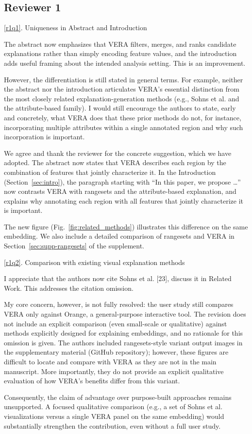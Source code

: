 \documentclass[11pt]{article}
\newcounter{rtaskno}
\newcommand{\rtask}[1]{\refstepcounter{rtaskno}\label{#1}}
\newcommand{\reviewc}[2]{\begin{leftbar}\noindent\rtask{#1}\ref{#1}. #2\end{leftbar}\vspace*{-4mm}}
\newcommand{\answer}[1]{\noindent #1\par\vspace{2mm}}
\newlength{\leftbarwidth}
\newlength{\leftbarsep}
\renewenvironment{leftbar}{%
    \def\FrameCommand{{\color{black}{\vrule width \leftbarwidth\relax\hspace {\leftbarsep}}}}%
    \MakeFramed {\advance \hsize -\width \FrameRestore }%
}{\endMakeFramed}
\begin{document}
\clearpage
\subsection*{Reviewer 1}

\reviewc{r1q1}{Uniqueness in Abstract and Introduction

The abstract now emphasizes that VERA filters, merges, and ranks candidate explanations rather than simply encoding feature values, and the introduction adds useful framing about the intended analysis setting. This is an improvement.

However, the differentiation is still stated in general terms. For example, neither the abstract nor the introduction articulates VERA's essential distinction from the most closely related explanation-generation methods (e.g., Sohns et al. and the attribute-based family). I would still encourage the authors to state, early and concretely, what VERA does that these prior methods do not, for instance, incorporating multiple attributes within a single annotated region and why such incorporation is important.}

\answer{%
We agree and thank the reviewer for the concrete suggestion, which we have adopted. The abstract now states that VERA describes each region by the combination of features that jointly characterize it. In the Introduction (Section~\ref{sec:intro}), the paragraph starting with ``In this paper, we propose \ldots'' now contrasts VERA with rangesets and the attribute-based explanation, and explains why annotating each region with all features that jointly characterize it is important.

The new figure (Fig.~\ref{fig:related_methods}) illustrates this difference on the same embedding. We also include a detailed comparison of rangesets and VERA in Section~\ref{sec:supp-rangesets} of the supplement.
}

\reviewc{r1q2}{Comparison with existing visual explanation methods

I appreciate that the authors now cite Sohns et al. [23], discuss it in Related Work. This addresses the citation omission.

My core concern, however, is not fully resolved: the user study still compares VERA only against Orange, a general-purpose interactive tool. The revision does not include an explicit comparison (even small-scale or qualitative) against methods explicitly designed for explaining embeddings, and no rationale for this omission is given. The authors included rangesets-style variant output images in the supplementary material (GitHub repository); however, these figures are difficult to locate and compare with VERA as they are not in the main manuscript. More importantly, they do not provide an explicit qualitative evaluation of how VERA's benefits differ from this variant.

Consequently, the claim of advantage over purpose-built approaches remains unsupported. A focused qualitative comparison (e.g., a set of Sohns et al. visualizations versus a single VERA panel on the same embedding) would substantially strengthen the contribution, even without a full user study.}
\end{document}
